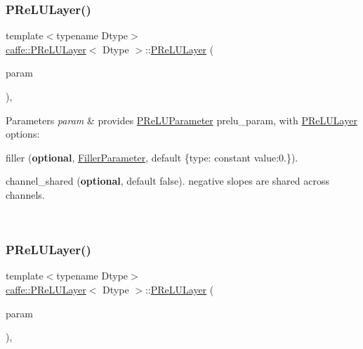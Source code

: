\subsubsection{\texorpdfstring{P\+Re\+L\+U\+Layer()}{PReLULayer()}\hspace{0.1cm}{\footnotesize\ttfamily [1/2]}}
{\footnotesize\ttfamily template$<$typename Dtype$>$ \\
\mbox{\hyperlink{classcaffe_1_1_p_re_l_u_layer}{caffe\+::\+P\+Re\+L\+U\+Layer}}$<$ Dtype $>$\+::\mbox{\hyperlink{classcaffe_1_1_p_re_l_u_layer}{P\+Re\+L\+U\+Layer}} (\begin{DoxyParamCaption}\item[{const \mbox{\hyperlink{classcaffe_1_1_layer_parameter}{Layer\+Parameter}} \&}]{param }\end{DoxyParamCaption})\hspace{0.3cm}{\ttfamily [inline]}, {\ttfamily [explicit]}}


\begin{DoxyParams}{Parameters}
{\em param} & provides \mbox{\hyperlink{classcaffe_1_1_p_re_l_u_parameter}{P\+Re\+L\+U\+Parameter}} prelu\+\_\+param, with \mbox{\hyperlink{classcaffe_1_1_p_re_l_u_layer}{P\+Re\+L\+U\+Layer}} options\+:
\begin{DoxyItemize}
\item filler ({\bfseries optional}, \mbox{\hyperlink{classcaffe_1_1_filler_parameter}{Filler\+Parameter}}, default \{\textquotesingle{}type\textquotesingle{}\+: constant \textquotesingle{}value\textquotesingle{}\+:0.\}).
\item channel\+\_\+shared ({\bfseries optional}, default false). negative slopes are shared across channels. 
\end{DoxyItemize}\\
\hline
\end{DoxyParams}
\mbox{\label{classcaffe_1_1_p_re_l_u_layer_a9d164a537a2f77b4143d2491f4809732}} 
\subsubsection{\texorpdfstring{P\+Re\+L\+U\+Layer()}{PReLULayer()}\hspace{0.1cm}{\footnotesize\ttfamily [2/2]}}
{\footnotesize\ttfamily template$<$typename Dtype$>$ \\
\mbox{\hyperlink{classcaffe_1_1_p_re_l_u_layer}{caffe\+::\+P\+Re\+L\+U\+Layer}}$<$ Dtype $>$\+::\mbox{\hyperlink{classcaffe_1_1_p_re_l_u_layer}{P\+Re\+L\+U\+Layer}} (\begin{DoxyParamCaption}\item[{const \mbox{\hyperlink{classcaffe_1_1_layer_parameter}{Layer\+Parameter}} \&}]{param }\end{DoxyParamCaption})\hspace{0.3cm}{\ttfamily [inline]}, {\ttfamily [explicit]}}


